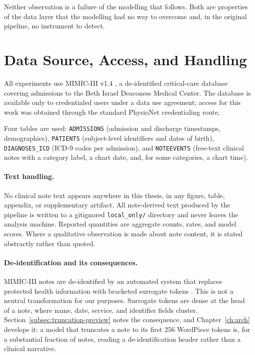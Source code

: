 Neither observation is a failure of the modelling that follows. Both are
properties of the data layer that the modelling had no way to overcome and,
in the original pipeline, no instrument to detect.

\section{Data Source, Access, and Handling}
\label{sec:source}

All experiments use MIMIC-III v1.4 \citep{johnson2016mimic}, a de-identified
critical-care database covering admissions to the Beth Israel Deaconess Medical
Center. The database is available only to credentialed users under a data use
agreement; access for this work was obtained through the standard PhysioNet
credentialing route.

Four tables are used: \texttt{ADMISSIONS} (admission and discharge timestamps,
demographics), \texttt{PATIENTS} (subject-level identifiers and dates of birth),
\texttt{DIAGNOSES\_ICD} (ICD-9 codes per admission), and \texttt{NOTEEVENTS}
(free-text clinical notes with a category label, a chart date, and, for some
categories, a chart time).

\paragraph{Text handling.} No clinical note text appears anywhere in this
thesis, in any figure, table, appendix, or supplementary artifact. All
note-derived text produced by the pipeline is written to a gitignored
\texttt{local\_only/} directory and never leaves the analysis machine. Reported
quantities are aggregate counts, rates, and model scores. Where a qualitative
observation is made about note content, it is stated abstractly rather than
quoted.

\paragraph{De-identification and its consequences.} MIMIC-III notes are
de-identified by an automated system that replaces protected health information
with bracketed surrogate tokens \citep{neamatullah2008deid}. This is not a
neutral transformation for our purposes. Surrogate tokens are dense at the head
of a note, where name, date, service, and identifier fields cluster.
Section~\ref{subsec:truncation-preview} notes the consequence, and
Chapter~\ref{ch:arch} develops it: a model that truncates a note to its first
$256$ WordPiece tokens is, for a substantial fraction of notes, reading a
de-identification header rather than a clinical narrative.

